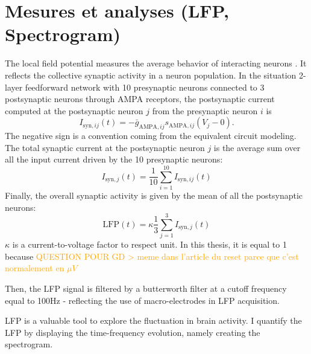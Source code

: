 \section{Mesures et analyses (LFP, Spectrogram)}
The local field potential measures the average behavior of interacting neurons \cite{drion_cellular_2019, jacquerie_robust_2021, jacquerie_switches_2022}. It reflects the collective synaptic activity in a neuron population. In the situation 2-layer feedforward network with 10 presynaptic neurons connected to 3 postsynaptic neurons through AMPA receptors, the postsynaptic current computed at the postsynaptic neuron $j$ from the presynaptic neuron $i$ is $$I_{\mathrm{syn},ij}(t) = -\bar{g}_{\mathrm{AMPA},ij} s_{\mathrm{AMPA},ij} (V_j - 0).$$
The negative sign is a convention coming from the equivalent circuit modeling.  The total synaptic current at the postsynaptic neuron $j$ is the average sum over all the input current driven by the 10 presynaptic neurons: 
$$ I_{\mathrm{syn},j}(t) = \frac{1}{10} \sum_{i=1}^{10} I_{\mathrm{syn},ij}(t) $$
Finally, the overall synaptic activity is given by the mean of all the postsynaptic neurons: 
$$ \mathrm{LFP}(t) = \kappa \frac{1}{3} \sum_{j=1}^3 I_{\mathrm{syn},j}(t)$$
$\kappa$ is a current-to-voltage factor to respect unit. In this thesis, it is equal to 1 because \textcolor{orange}{QUESTION POUR GD > meme dans l'article du reset parce que c'est normalement en $\mu V$}

Then, the \acrshort{LFP} signal is filtered by a butterworth filter at a cutoff frequency equal to 100Hz - reflecting the use of macro-electrodes in LFP acquisition. 

\acrshort{LFP} is a valuable tool to explore the fluctuation in brain activity. I quantify the LFP by displaying the time-frequency evolution, namely creating the spectrogram. 


\citep{esser_breakdown_2009, mazzoni_computing_2015, telenczuk_kernel-based_2020}